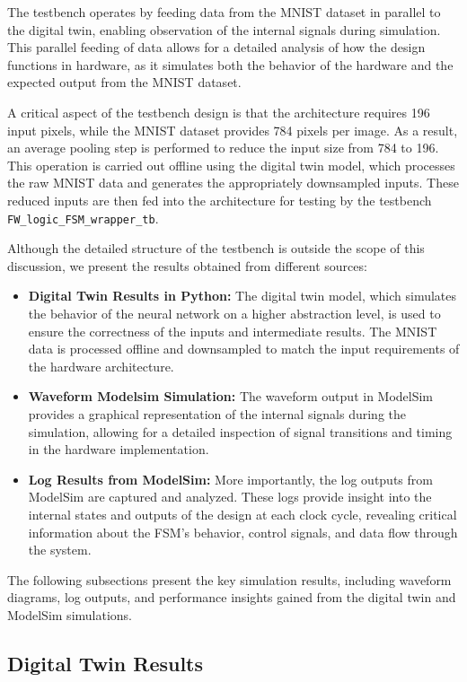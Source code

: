 \documentclass[11pt]{report}
\begin{document}
The testbench operates by feeding data from the MNIST dataset in parallel to the digital twin, enabling observation of the internal signals during simulation. This parallel feeding of data allows for a detailed analysis of how the design functions in hardware, as it simulates both the behavior of the hardware and the expected output from the MNIST dataset.

A critical aspect of the testbench design is that the architecture requires 196 input pixels, while the MNIST dataset provides 784 pixels per image. As a result, an average pooling step is performed to reduce the input size from 784 to 196. This operation is carried out offline using the digital twin model, which processes the raw MNIST data and generates the appropriately downsampled inputs. These reduced inputs are then fed into the architecture for testing by the testbench \texttt{FW\_logic\_FSM\_wrapper\_tb}.

Although the detailed structure of the testbench is outside the scope of this discussion, we present the results obtained from different sources:

\begin{itemize}
    \item \textbf{Digital Twin Results in Python:} The digital twin model, which simulates the behavior of the neural network on a higher abstraction level, is used to ensure the correctness of the inputs and intermediate results. The MNIST data is processed offline and downsampled to match the input requirements of the hardware architecture.
    \item \textbf{Waveform Modelsim Simulation:} The waveform output in ModelSim provides a graphical representation of the internal signals during the simulation, allowing for a detailed inspection of signal transitions and timing in the hardware implementation.
    \item \textbf{Log Results from ModelSim:} More importantly, the log outputs from ModelSim are captured and analyzed. These logs provide insight into the internal states and outputs of the design at each clock cycle, revealing critical information about the FSM's behavior, control signals, and data flow through the system.
\end{itemize}

The following subsections present the key simulation results, including waveform diagrams, log outputs, and performance insights gained from the digital twin and ModelSim simulations.

\subsection{Digital Twin Results}  
\end{document}
